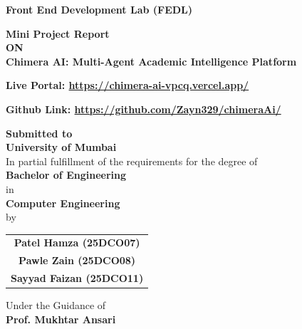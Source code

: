 \begin{center}
\textbf{\Large Front End Development Lab (FEDL)}\\
\vspace{0.25 cm}

\textbf{\LARGE Mini Project Report}\\
\vspace{0.25 cm}
\textbf{\Large ON}\\
\vspace{0.25 cm}
\textbf{\LARGE Chimera AI: Multi-Agent Academic Intelligence Platform}\\
\vspace{0.3 cm}

\textbf{ Live Portal: \url{https://chimera-ai-vpcq.vercel.app/}}\\
\vspace{0.2 cm}

\textbf{ Github Link: \url{https://github.com/Zayn329/chimeraAi/}}\\
\vspace{0.2 cm}

\textbf{Submitted to}\\
\vspace{0.1cm}
\large\textbf{University of Mumbai}\\
\vspace{0.1 cm}
In partial fulfillment of the requirements for the degree of \\
\vspace{0.35 cm}
\large{\textbf{Bachelor of Engineering}}\\
in\\
\vspace{0.25cm}
\large{\textbf{Computer Engineering}}\\

\vspace{0.1 cm}
by\\
\vspace{0.1 cm}

\begin{tabular}{c}
\large{\textbf{Patel Hamza (25DCO07)}} \\ 
\large{\textbf{Pawle Zain (25DCO08)}} \\ 
\large{\textbf{Sayyad Faizan (25DCO11)}} \\ 
\end{tabular}

\vspace{0.5 cm}

Under the Guidance of\\
\textbf{\Large Prof. Mukhtar Ansari}


\end{center}
